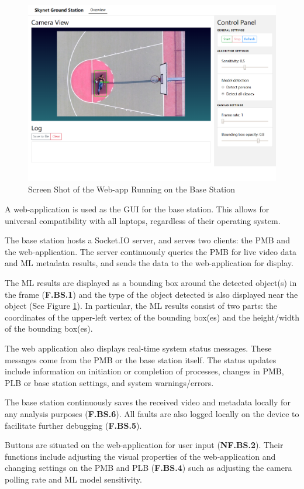 \begin{figure}[H]
\begin{mdframed}
\centering
\includegraphics[width=15cm]{img/base_station.png}
\end{mdframed}
\caption{Screen Shot of the Web-app Running on the Base Station}
\label{basestationdiag}
\end{figure}

A web-application is used as the GUI for the base station. This allows for universal compatibility with all laptops, regardless of their operating system.

The base station hosts a Socket.IO server, and serves two clients: the PMB and the web-application. The server continuously queries the PMB for live video data and ML metadata results, and sends the data to the web-application for display.

The ML results are displayed as a bounding box around the detected object(s) in the frame (\textbf{F.BS.1}) and the type of the object detected is also displayed near the object (See Figure \ref{basestationdiag}). In particular, the ML results consist of two parts: the coordinates of the upper-left vertex of the bounding box(es) and the height/width of the bounding box(es).

The web application also displays real-time system status messages. These messages come from the PMB or the base station itself. The status updates include information on initiation or completion of processes, changes in PMB, PLB or base station settings, and system warnings/errors.

The base station continuously saves the received video and metadata locally for any analysis purposes (\textbf{F.BS.6}). All faults are also logged locally on the device to facilitate further debugging (\textbf{F.BS.5}).

Buttons are situated on the web-application for user input (\textbf{NF.BS.2}). Their functions include adjusting the visual properties of the web-application and changing settings on the PMB and PLB (\textbf{F.BS.4}) such as adjusting the camera polling rate and ML model sensitivity.

